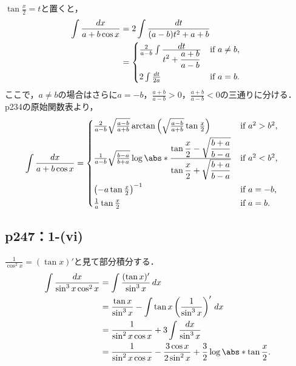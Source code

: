 \documentclass[a4paper,10pt,fleqn]{ltjsarticle}
\begin{document}
  \begin{tleftbar}
    $\tan \frac{x}{2} = t$と置くと，
    \begin{align*}
      \int \frac{dx}{a+b \cos x}
      &= 2 \int \frac{dt}{(a-b)t^2 + a+b} \\
      &= 
      \begin{cases*}
        \frac{2}{a-b} \int \frac{\displaystyle dt}{\displaystyle t^2 + \frac{a+b}{a-b}}
        & if $a \neq b$, \\
        2 \int \frac{dt}{2a} & if $a = b$.
      \end{cases*}
    \end{align*}
    ここで，$a \neq b$の場合はさらに$a = -b$，$\frac{a+b}{a-b} > 0$，$\frac{a+b}{a-b} < 0$の三通りに分ける．p234の原始関数表より，
    \begin{align*}
      \int \frac{dx}{a+b \cos x}
      &=
      \begin{cases*}
        \frac{2}{a-b} \sqrt{\frac{a-b}{a+b}}
        \arctan \left({\sqrt{\frac{a-b}{a+b}} \tan \frac{x}{2}}\right) & if $a^2 > b^2$, \\
        \frac{1}{a-b} \sqrt{\frac{b-a}{b+a}} 
        \log \abs*{\frac{\displaystyle\tan \frac{x}{2}
        - \sqrt{\frac{b+a}{b-a}}}{\displaystyle\tan \frac{x}{2} + \sqrt{\frac{b+a}{b-a}}}}
        & if $a^2 < b^2$, \\
        \left(-a \tan \frac{x}{2}\right)^{-1} & if $a = -b$, \\
        \frac{1}{a} \tan {\frac{x}{2}} & if $a = b$.
      \end{cases*}
    \end{align*}
  \end{tleftbar}

\subsection*{p247：1-(vi)}


    \begin{leftbar}
        $\frac{1}{\cos^2 x} = (\tan x)'$と見て部分積分する．
        \begin{align*}
          \int \frac{dx}{\sin^3 x \cos^2 x}
          &= \int \frac{(\tan x)'}{\sin^3 x} \,dx \\
          &= \frac{\tan x}{\sin^3 x} - \int \tan x \left(\frac{1}{\sin^3 x}\right)' \,dx \\
          &= \frac{1}{\sin^2 x \cos x} + 3 \int \frac{dx}{\sin^3 x} \\
          &= \frac{1}{\sin^2 x \cos x} - \frac{3 \cos x}{2 \sin^2 x} + \frac{3}{2} \log \abs*{\tan \frac{x}{2}}.
        \end{align*}
      \end{leftbar}
\end{document}
